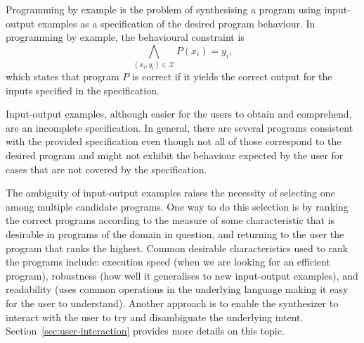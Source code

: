 \begin{definition}
Programming by example is the problem of synthesising a program using input-output examples as a specification of the desired program behaviour. In programming by example, the behavioural constraint is
\[\bigwedge_{(x_i, y_i) \in \mathcal{X}} P(x_i) = y_i,\]
which states that program \(P\) is correct if it yields the correct output for the inputs specified in the specification.
\end{definition}

Input-output examples, although easier for the users to obtain and comprehend, are an incomplete specification. In general, there are several programs consistent with the provided specification even though not all of those correspond to the desired program and might not exhibit the behaviour expected by the user for cases that are not covered by the specification.

The ambiguity of input-output examples raises the necessity of selecting one among multiple candidate programs. One way to do this selection is by ranking the correct programs according to the measure of some characteristic that is desirable in programs of the domain in question, and returning to the user the program that ranks the highest.
Common desirable characteristics used to rank the programs include: execution speed (when we are looking for an efficient program), robustness (how well it generalises to new input-output examples), and readability (uses common operations in the underlying language making it easy for the user to understand).
Another approach is to enable the synthesizer to interact with the user to try and disambiguate the underlying intent. Section~\ref{sec:user-interaction} provides more details on this topic.

